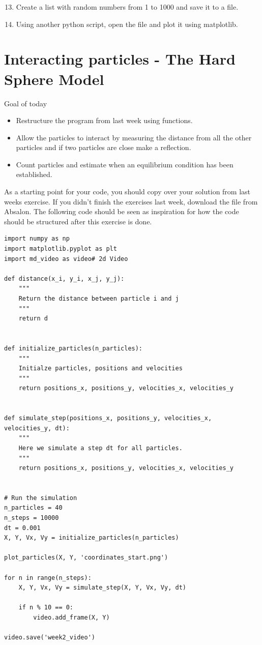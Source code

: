 \documentclass{article}
\begin{document}
\begin{enumerate}
    \setcounter{enumi}{12}

    \item Create a list with random numbers from 1 to 1000 and save it to a file.

    \item Using another python script, open the file and plot it using matplotlib.

\end{enumerate}


\newpage
\section{Interacting particles - The Hard Sphere Model}

Goal of today

\begin{itemize}
    \item Restructure the program from last week using functions.
    \item Allow the particles to interact by measuring the distance from all
        the other particles and if two particles are close make a reflection.
    \item Count particles and estimate when an equilibrium condition has been established.
\end{itemize}

As a starting point for your code, you should copy over your solution from last
weeks exercise. If you didn't finish the exercises last week, download the file
 from Absalon. The following code should be seen as
inspiration for how the code should be structured after this exercise is done.

\begin{lstlisting}
import numpy as np
import matplotlib.pyplot as plt
import md_video as video# 2d Video

def distance(x_i, y_i, x_j, y_j):
    """
    Return the distance between particle i and j
    """
    return d


def initialize_particles(n_particles):
    """
    Initialze particles, positions and velocities
    """
    return positions_x, positions_y, velocities_x, velocities_y


def simulate_step(positions_x, positions_y, velocities_x, velocities_y, dt):
    """
    Here we simulate a step dt for all particles.
    """
    return positions_x, positions_y, velocities_x, velocities_y


# Run the simulation
n_particles = 40
n_steps = 10000
dt = 0.001
X, Y, Vx, Vy = initialize_particles(n_particles)

plot_particles(X, Y, 'coordinates_start.png')

for n in range(n_steps):
    X, Y, Vx, Vy = simulate_step(X, Y, Vx, Vy, dt)

    if n % 10 == 0:
        video.add_frame(X, Y)

video.save('week2_video')

\end{lstlisting}
\end{document}
